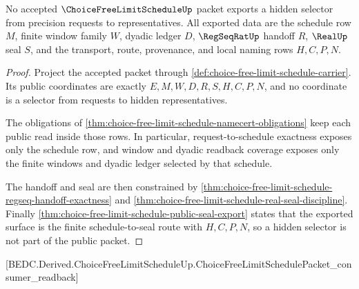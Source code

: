 \begin{theorem}
\label{thm:choice-free-limit-schedule-no-selector-extraction}
No accepted $\ChoiceFreeLimitScheduleUp$ packet exports a hidden selector from precision requests to representatives. All exported data are the schedule row $M$, finite window family $W$, dyadic ledger $D$, $\RegSeqRatUp$ handoff $R$, $\RealUp$ seal $S$, and the transport, route, provenance, and local naming rows $H,C,P,N$.
\end{theorem}
\begin{proof}
Project the accepted packet through \autoref{def:choice-free-limit-schedule-carrier}. Its public coordinates are exactly $E,M,W,D,R,S,H,C,P,N$, and no coordinate is a selector from requests to hidden representatives.

The obligations of \autoref{thm:choice-free-limit-schedule-namecert-obligations} keep each public read inside those rows. In particular, request-to-schedule exactness exposes only the schedule row, and window and dyadic readback coverage exposes only the finite windows and dyadic ledger selected by that schedule.

The handoff and seal are then constrained by \autoref{thm:choice-free-limit-schedule-regseq-handoff-exactness} and \autoref{thm:choice-free-limit-schedule-real-seal-discipline}. Finally \autoref{thm:choice-free-limit-schedule-public-seal-export} states that the exported surface is the finite schedule-to-seal route with $H,C,P,N$, so a hidden selector is not part of the public packet.
\end{proof}

[BEDC.Derived.ChoiceFreeLimitScheduleUp.ChoiceFreeLimitSchedulePacket\_consumer\_readback]

\begin{closurestatus}{\ChoiceFreeLimitScheduleUp}
  \theoryclosure{\matureClosure}
  \formalstatus{\axiomCleanV}
\end{closurestatus}
